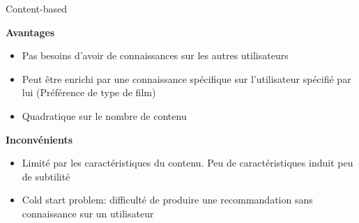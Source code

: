 \begin{frame}{Content-based}

  \begin{minipage}[t]{0.49\linewidth}
    \alert{\textbf{Avantages}}
    \begin{itemize}
    \item Pas besoins d'avoir de connaissances sur les autres utilisateurs
    \item Peut être enrichi par une connaissance spécifique sur l'utilisateur spécifié par lui (Préférence de type de film)
    \item Quadratique sur le nombre de contenu
  \end{itemize}
  
\end{minipage}
\begin{minipage}[t]{0.49\linewidth}
  \alert{\textbf{Inconvénients}}
  \begin{itemize}
    \item Limité par les caractéristiques du contenu. Peu de caractéristiques induit peu de subtilité
    \item \og Cold start problem\fg : difficulté de produire une recommandation sans connaissance sur un utilisateur
  \end{itemize}
\end{minipage}
\end{frame}

